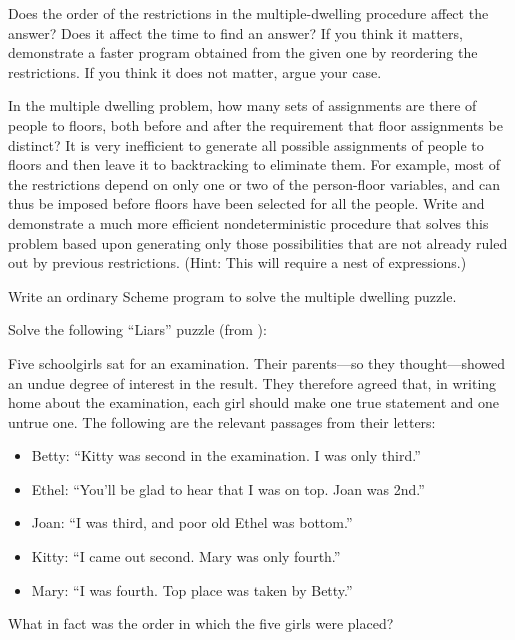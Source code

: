 \begin{exercise}
	\label{Exercise 4.39}
	Does the order of the restrictions in the multiple-dwelling procedure affect the answer?
	Does it affect the time to find an answer?
	If you think it matters, demonstrate a faster program obtained from the given one by reordering the restrictions.
	If you think it does not matter, argue your case.
\end{exercise}



\begin{exercise}
	\label{Exercise 4.40}
	In the multiple dwelling problem, how many sets of assignments are there of people to floors, both before and after the requirement that floor assignments be distinct?
	It is very inefficient to generate all possible assignments of people to floors and then leave it to backtracking to eliminate them.
	For example, most of the restrictions depend on only one or two of the person-floor variables, and can thus be imposed before floors have been selected for all the people.
	Write and demonstrate a much more efficient nondeterministic procedure that solves this problem based upon generating only those possibilities that are not already ruled out by previous restrictions.
	(Hint: This will require a nest of  expressions.)
\end{exercise}



\begin{exercise}
	\label{Exercise 4.41}
	Write an ordinary Scheme program to solve the multiple dwelling puzzle.
\end{exercise}



\begin{exercise}
	\label{Exercise 4.42}
	Solve the following “Liars” puzzle (from ):

	Five schoolgirls sat for an examination.
	Their parents---so they thought---showed an undue degree of interest in the result.
	They therefore agreed that, in writing home about the examination, each girl should make one true statement and one untrue one.
	The following are the relevant passages from their letters:
	\begin{itemize}

		\item
			Betty:
			“Kitty was second in the examination.
			I was only third.”

		\item
			Ethel:
			“You'll be glad to hear that I was on top.
			Joan was 2nd.”

		\item
			Joan:
			“I was third, and poor old Ethel was bottom.”

		\item
			Kitty:
			“I came out second.
			Mary was only fourth.”

		\item
			Mary:
			“I was fourth.
			Top place was taken by Betty.”

	\end{itemize}
	What in fact was the order in which the five girls were placed?
\end{exercise}



